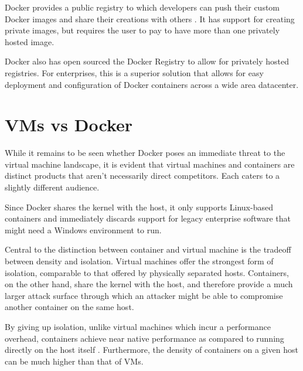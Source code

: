 \documentclass[\myfontsize, letterpaper]{article}
\begin{document}
Docker provides a public registry to which developers can push their custom Docker images and share their creations with others \cite{dockerregistry}. It has support for creating private images, but requires the user to pay to have more than one privately hosted image.

Docker also has open sourced the Docker Registry \cite{dockerregistry-github} to allow for privately hosted registries. For enterprises, this is a superior solution that allows for easy deployment and configuration of Docker containers across a wide area datacenter.


\section{VMs vs Docker}
\label{sec:vmvsdocker}
While it remains to be seen whether Docker poses an immediate threat to the virtual machine landscape, it is evident that virtual machines and containers are distinct products that aren't necessarily direct competitors. Each caters to a slightly different audience.

Since Docker shares the kernel with the host, it only supports Linux-based containers and immediately discards support for legacy enterprise software that might need a Windows environment to run.

Central to the distinction between container and virtual machine is the tradeoff between density and isolation. Virtual machines offer the strongest form of isolation, comparable to that offered by physically separated hosts. Containers, on the other hand, share the kernel with the host, and therefore provide a much larger attack surface through which an attacker might be able to compromise another container on the same host. 

By giving up isolation, unlike virtual machines which incur a performance overhead, containers achieve near native performance as compared to running directly on the host itself \cite{performance}. Furthermore, the density of containers on a given host can be much higher than that of VMs. 
\end{document}
